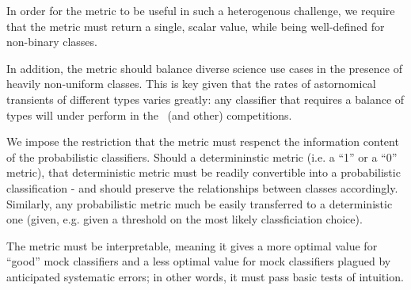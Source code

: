 In order for the metric to be useful in such a heterogenous challenge, we require that the metric must return a single, scalar value, while being well-defined for non-binary classes.

In addition, the metric should balance diverse science use cases in the presence of heavily non-uniform classes.
This is key given that the rates of astornomical transients of different types varies greatly: any classifier that requires a balance of types will under perform in the \plasticc\ (and other) competitions.

We impose the restriction that the metric must respenct the information content of the probabilistic classifiers.
Should a determininstic metric (i.e. a ``1'' or a ``0'' metric), that deterministic metric must be readily convertible into a probabilistic classification - and should preserve the relationships between classes accordingly.
Similarly, any probabilistic metric much be easily transferred to a deterministic one (given, e.g. given a threshold on the most likely classficiation choice).

The metric must be interpretable, meaning it gives a more optimal value for ``good'' mock classifiers and a less optimal value for mock classifiers plagued by anticipated systematic errors; in other words, it must pass basic tests of intuition.


